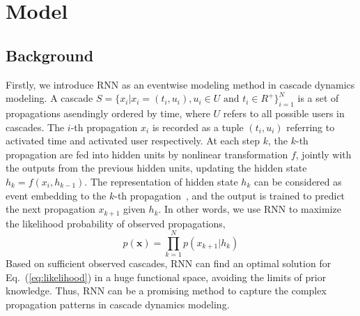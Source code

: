 \section{Model}

\subsection{Background}
Firstly, we introduce RNN as an eventwise modeling method in cascade dynamics
modeling. A cascade $S=\{x_i|x_i=(t_i, u_i), u_i\in U \text{~and~}
t_i\in R^+\}_{i=1}^N$ is a set of propagations asendingly ordered by time,
where $U$ refers to all possible users in cascades. The $i$-th propagation $x_i$
is recorded as a tuple $(t_i, u_i)$ referring to activated time and activated user
respectively. At each step $k$, the $k$-th propagation are fed into hidden
units by nonlinear transformation $f$, jointly with the outputs from the
previous hidden units, updating the hidden state $h_k=f(x_i,h_{k-1})$. The
representation of hidden state $h_k$ can be considered as event embedding to
the $k$-th propagation~\cite{DuKDD2016}, and the output is trained to predict
the next propagation $x_{k+1}$ given $h_k$. In other words, we use RNN to
maximize the likelihood probability of observed propagations,
\begin{equation}
\label{eq:likelihood}
p(\textbf{x})=\prod_{k=1}^N p(x_{k+1}|h_k)
\end{equation}
Based on sufficient observed cascades, RNN
can find an optimal solution for Eq.~(\ref{eq:likelihood})
in a huge functional space, avoiding the limits of prior knowledge. Thus, RNN
can be a promising method to capture the complex propagation patterns in cascade
dynamics modeling. 

